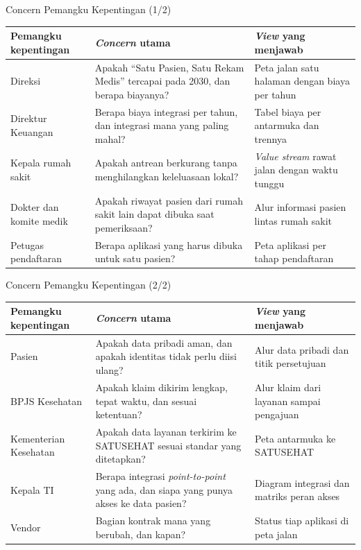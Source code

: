 \documentclass[aspectratio=169, table, 12pt]{beamer}
\begin{document}
\begin{frame}{{\Large Concern Pemangku Kepentingan (1/2)}}
  \footnotesize
  \begin{tabularx}{\textwidth}{>{\raggedright\arraybackslash}p{2.3cm}
      >{\raggedright\arraybackslash}X >{\raggedright\arraybackslash}p{3.7cm}}
    \hline
    \textbf{Pemangku kepentingan} & \textbf{\textit{Concern} utama} & \textbf{\textit{View} yang menjawab} \\
    \hline
    Direksi & Apakah ``Satu Pasien, Satu Rekam Medis'' tercapai pada 2030, dan berapa biayanya? & Peta jalan satu halaman dengan biaya per tahun \\
    \hline
    Direktur Keuangan & Berapa biaya integrasi per tahun, dan integrasi mana yang paling mahal? & Tabel biaya per antarmuka dan trennya \\
    \hline
    Kepala rumah sakit & Apakah antrean berkurang tanpa menghilangkan keleluasaan lokal? & \textit{Value stream} rawat jalan dengan waktu tunggu \\
    \hline
    Dokter dan komite medik & Apakah riwayat pasien dari rumah sakit lain dapat dibuka saat pemeriksaan? & Alur informasi pasien lintas rumah sakit \\
    \hline
    Petugas pendaftaran & Berapa aplikasi yang harus dibuka untuk satu pasien? & Peta aplikasi per tahap pendaftaran \\
    \hline
  \end{tabularx}
\end{frame}

\begin{frame}{{\Large Concern Pemangku Kepentingan (2/2)}}
  \footnotesize
  \begin{tabularx}{\textwidth}{>{\raggedright\arraybackslash}p{2.3cm}
      >{\raggedright\arraybackslash}X >{\raggedright\arraybackslash}p{3.7cm}}
    \hline
    \textbf{Pemangku kepentingan} & \textbf{\textit{Concern} utama} & \textbf{\textit{View} yang menjawab} \\
    \hline
    Pasien & Apakah data pribadi aman, dan apakah identitas tidak perlu diisi ulang? & Alur data pribadi dan titik persetujuan \\
    \hline
    BPJS Kesehatan & Apakah klaim dikirim lengkap, tepat waktu, dan sesuai ketentuan? & Alur klaim dari layanan sampai pengajuan \\
    \hline
    Kementerian Kesehatan & Apakah data layanan terkirim ke SATUSEHAT sesuai standar yang ditetapkan? & Peta antarmuka ke SATUSEHAT \\
    \hline
    Kepala TI & Berapa integrasi \textit{point-to-point} yang ada, dan siapa yang punya akses ke data pasien? & Diagram integrasi dan matriks peran akses \\
    \hline
    Vendor & Bagian kontrak mana yang berubah, dan kapan? & Status tiap aplikasi di peta jalan \\
    \hline
  \end{tabularx}
\end{frame}
\end{document}
